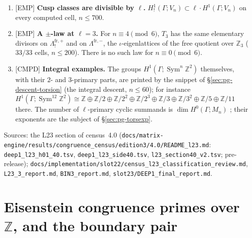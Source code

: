 \documentclass[11pt]{article}
\newcommand{\Z}{\mathbb{Z}}
\newcommand{\Sym}{\operatorname{Sym}}
\newcommand{\Ga}{\Gamma}
\newcommand{\pfile}[1]{\nolinkurl{#1}}
\newcommand{\CMPD}{\textsf{\small[CMPD]}}
\newcommand{\EMP}{\textsf{\small[EMP]}}
\begin{document}
\begin{enumerate}[leftmargin=1.8em,itemsep=2pt]
\begin{itemize}[itemsep=0pt]
  \item at $\ell=3$, odd $n$, all groups vanish.
  \end{itemize}
  The rank formulas behind these values ($h^{q}=2d-a-s$ at $\ell=2$, and their analogues at $\ell=3$) are Lean theorems for every $n$; the
  values themselves are kernel-checked cell by cell for $n\le700$ (\textsf{\small[LEAN]} evidence for $n\le64$ and a few larger $n$, data beyond)
  {}. The closed forms above are read off those values, not formalised for every $n$. Odd $n$ at $\ell=2$ is
  {}.
\item \EMP{} \textbf{Cusp classes are divisible by $\ell$.} $H^{1}_{!}(\Ga;V_n)\subset\ell\cdot H^{1}(\Ga;V_n)$ on every computed cell,
  $n\le700$.
\item \EMP{} \textbf{A $\pm$-law at $\ell=3$.} For $n\equiv4\pmod6$, $T_3$ has the same elementary divisors on $\Lambda^{\mathrm{fr},+}_{!}$ and on
  $\Lambda^{\mathrm{fr},-}$, the $\iota$-eigenlattices of the free quotient over $\Z_3$ ($33/33$ cells, $n\le200$). There is no such law for $n\equiv0\pmod6$.
\item \CMPD{} \textbf{Integral examples.} The groups $H^{1}(\Ga;\Sym^{n}\Z^{2})$ themselves, with their $2$- and $3$-primary parts, are printed
  by the snippet of \S\ref{sec:pg-descent-torsion} (the integral descent, $n\le60$); for instance $H^{1}(\Ga;\Sym^{12}\Z^{2})\cong\Z\oplus\Z/2\oplus
  \Z/2^{2}\oplus\Z/2^{3}\oplus\Z/3\oplus\Z/3^{2}\oplus\Z/5\oplus\Z/11$ there. The number of $\ell$-primary cyclic summands is
  $\dim H^{0}(\Ga;M_n)$ {\ttfamily[C,~cl:bockstein]}; their exponents are the subject of \S\ref{sec:pg-torsexp}.
\end{enumerate}

\noindent Sources: the L23 section of census~4.0 (\pfile{docs/matrix-engine/results/congruence_census/edition3/4.0/README_l23.md}:
\pfile{deep1_l23_h01_40.tsv}, \pfile{deep1_l23_side40.tsv}, \pfile{l23_section40_v2.tsv}; pre-release);
\pfile{docs/implementation/slot22/census_l23_classification_review.md}, \pfile{L23_3_report.md}, \pfile{BIN3_report.md},
\pfile{slot23/DEEP1_final_report.md}.

\section{Eisenstein congruence primes over \texorpdfstring{$\Z$}{Z}, and the boundary pair}\label{sec:pg-descent-congruence}
\end{document}
